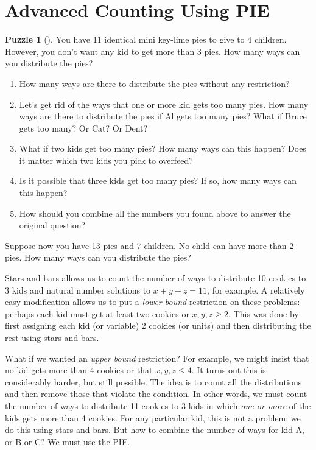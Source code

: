 \documentclass[10pt,]{book}
\theoremstyle{plain}
\theoremstyle{definition}
\theoremstyle{definition}
\theoremstyle{definition}
\newtheorem{investigation}[project]{Puzzle}
\numberwithin{equation}{chapter}
\begin{document}
\section[{Advanced Counting Using PIE}]{Advanced Counting Using PIE}\label{sec_advPIE}
\begin{investigation}[]\label{investigation-8}
\hypertarget{p-1062}{}%
You have 11 identical mini key-lime pies to give to 4 children. However, you don't want any kid to get more than 3 pies. How many ways can you distribute the pies? %
\begin{enumerate}
\item\hypertarget{li-61}{}\hypertarget{p-1063}{}%
How many ways are there to distribute the pies without any restriction?%
\item\hypertarget{li-62}{}\hypertarget{p-1064}{}%
Let's get rid of the ways that one or more kid gets too many pies. How many ways are there to distribute the pies if Al gets too many pies? What if Bruce gets too many? Or Cat? Or Dent?%
\item\hypertarget{li-63}{}\hypertarget{p-1065}{}%
What if two kids get too many pies? How many ways can this happen? Does it matter which two kids you pick to overfeed?%
\item\hypertarget{li-64}{}\hypertarget{p-1066}{}%
Is it possible that three kids get too many pies? If so, how many ways can this happen?%
\item\hypertarget{li-65}{}\hypertarget{p-1067}{}%
How should you combine all the numbers you found above to answer the original question?%
\end{enumerate}
%
\par
\hypertarget{p-1068}{}%
Suppose now you have 13 pies and 7 children. No child can have more than 2 pies. How many ways can you distribute the pies?%
\end{investigation}
\hypertarget{p-1069}{}%
Stars and bars allows us to count the number of ways to distribute 10 cookies to 3 kids and natural number solutions to \(x+y+z = 11\), for example. A relatively easy modification allows us to put a \emph{lower bound} restriction on these problems: perhaps each kid must get at least two cookies or \(x,y,z \ge 2\). This was done by first assigning each kid (or variable) 2 cookies (or units) and then distributing the rest using stars and bars.%
\par
\hypertarget{p-1070}{}%
What if we wanted an \emph{upper bound} restriction? For example, we might insist that no kid gets more than 4 cookies or that \(x, y, z \le 4\). It turns out this is considerably harder, but still possible. The idea is to count all the distributions and then remove those that violate the condition. In other words, we must count the number of ways to distribute 11 cookies to 3 kids in which \emph{one or more} of the kids gets more than 4 cookies. For any particular kid, this is not a problem; we do this using stars and bars. But how to combine the number of ways for kid A, or B or C? We must use the PIE.%
\end{document}
